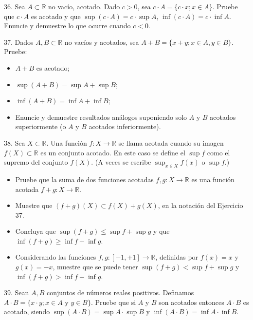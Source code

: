 \documentclass[12pt,oneside]{book}
\begin{document}
36. Sea \(A \subset \mathbb{R}\) no vacío, acotado. Dado \(c > 0\), sea \(c \cdot A = \{c \cdot x; x \in A\}\). Pruebe que \(c \cdot A\) es acotado y que \(\sup(c \cdot A) = c \cdot \sup A\), \(\inf(c \cdot A) = c \cdot \inf A\). Enuncie y demuestre lo que ocurre cuando \(c < 0\).

37. Dados \(A, B \subset \mathbb{R}\) no vacíos y acotados, sea \(A + B = \{x + y; x \in A, y \in B\}\). Pruebe:

\begin{itemize}
    \item [i)] \(A + B\) es acotado;
    \item [ii)] \(\sup(A + B) = \sup A + \sup B\);
    \item [iii)] \(\inf(A + B) = \inf A + \inf B\);
    \item [iv)] Enuncie y demuestre resultados análogos suponiendo solo \(A\) y \(B\) acotados superiormente (o \(A\) y \(B\) acotados inferiormente).
\end{itemize}

38. Sea \(X \subset \mathbb{R}\). Una función \(f: X \to \mathbb{R}\) se llama acotada cuando su imagen \(f(X) \subset \mathbb{R}\) es un conjunto acotado. En este caso se define el \(\sup f\) como el supremo del conjunto \(f(X)\). (A veces se escribe \(\sup_{x\in X} f(x)\) o \(\sup f\).)

\begin{itemize}
    \item [i)] Pruebe que la suma de dos funciones acotadas \(f, g: X \to \mathbb{R}\) es una función acotada \(f + g: X \to \mathbb{R}\).
    \item [ii)] Muestre que \((f + g)(X) \subset f(X) + g(X)\), en la notación del Ejercicio 37.
    \item [iii)] Concluya que \(\sup(f + g) \leq \sup f + \sup g\) y que \(\inf(f + g) \geq \inf f + \inf g\).
    \item [iv)] Considerando las funciones \(f, g: [-1, +1] \to \mathbb{R}\), definidas por \(f(x) = x\) y \(g(x) = -x\), muestre que se puede tener \(\sup(f + g) < \sup f + \sup g\) y \(\inf(f + g) > \inf f + \inf g\).
\end{itemize}

39. Sean \(A, B\) conjuntos de números reales positivos. Definamos \(A \cdot B = \{x \cdot y; x \in A \text{ y } y \in B\}\). Pruebe que si \(A\) y \(B\) son acotados entonces \(A \cdot B\) es acotado, siendo \(\sup(A \cdot B) = \sup A \cdot \sup B\) y \(\inf(A \cdot B) = \inf A \cdot \inf B\).
\end{document}
